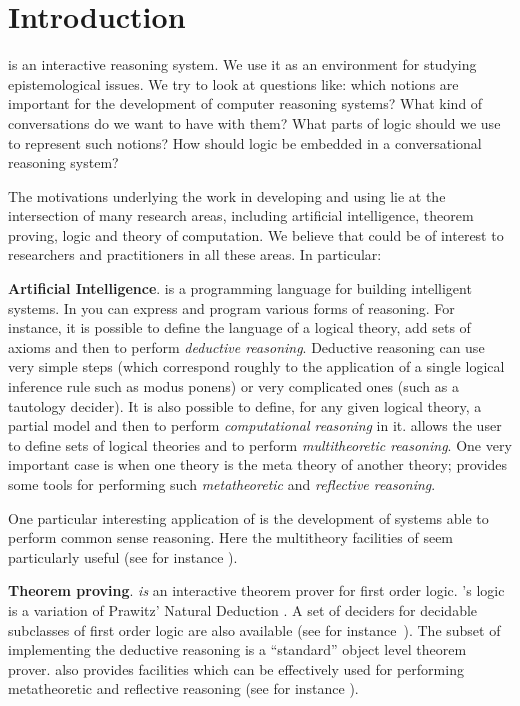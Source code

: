 \section{Introduction}

{\GF} is an interactive reasoning system.
We use it as an environment for studying epistemological issues.
We try to look at questions like: which notions are  important for the
development of computer reasoning systems?
What kind of conversations do we want to have with them? What parts of logic
should we use to represent such notions?
How should logic be embedded in a conversational reasoning system?

\vspace{0.1cm}
\noindent
The motivations underlying the work in developing and using {\GF} lie at the
intersection of many research areas, including artificial intelligence, theorem
proving, logic and theory of computation.
We believe that {\GF} could be of interest to researchers and practitioners in
all these areas.
In particular:

\vspace{0.2cm}
\noindent
{\bf Artificial Intelligence}.
{\GF} is a programming language for building intelligent systems.
In {\GF} you can express and program various forms of reasoning.
For instance, it is possible to define the language of a logical theory, add
sets of axioms and then to perform {\it deductive reasoning}.
Deductive reasoning can use very simple steps (which correspond roughly to the
application of a single logical inference rule such as modus ponens) or very
complicated ones (such as a tautology decider).
It is also possible to define, for any given logical theory, a partial model and
then to perform {\it computational reasoning} in it.
{\GF} allows the user to define sets of logical theories and to perform
{\it multitheoretic reasoning}. One very important case is when one
theory is the meta theory of another theory; {\GF} provides some tools
for performing such {\it metatheoretic} and {\it reflective reasoning}.

One particular interesting application of {\GF} is the development of systems
able to perform common sense reasoning.
Here the multitheory facilities of {\GF} seem particularly useful (see for
instance \cite{giunchiglia2,giunchiglia22}).

\vspace{0.2cm}
\noindent
{\bf Theorem proving}.
{\GF} {\it is} an interactive theorem prover for first order logic.
{\GF}'s logic is a variation of Prawitz' Natural Deduction \cite{prawitz1}.
A set of deciders for decidable subclasses of first order logic are also available
(see for instance~\cite{aiello2,armando1}).
The subset of {\GF} implementing the deductive reasoning is a ``standard'' object
level theorem prover.
{\GF} also provides facilities which can be effectively used for performing
metatheoretic and reflective reasoning (see for instance \cite{aiello1,rww1,rww2} 
\cite{giunchiglia3,giunchiglia13,giunchiglia25,giunchiglia27,basin1}).

